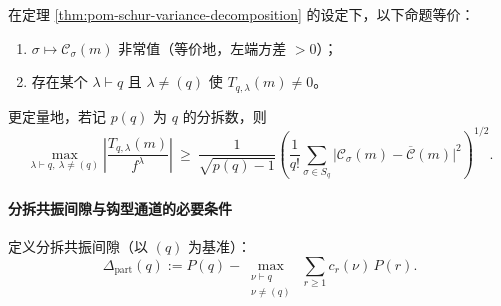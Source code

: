 \begin{corollary}\label{cor:pom-schur-nontrivial-channel-activation}
在定理 \ref{thm:pom-schur-variance-decomposition} 的设定下，以下命题等价：
\begin{enumerate}
  \item \(\sigma\mapsto \mathcal C_\sigma(m)\) 非常值（等价地，左端方差 \(>0\)）；
  \item 存在某个 \(\lambda\vdash q\) 且 \(\lambda\ne(q)\) 使 \(T_{q,\lambda}(m)\ne 0\)。
\end{enumerate}
更定量地，若记 \(p(q)\) 为 \(q\) 的分拆数，则
\[
\max_{\lambda\vdash q,\ \lambda\ne(q)}\left|\frac{T_{q,\lambda}(m)}{f^\lambda}\right|
\ \ge\
\frac{1}{\sqrt{p(q)-1}}\left(\frac{1}{q!}\sum_{\sigma\in S_q}\bigl|\mathcal{C}_\sigma(m)-\overline{\mathcal C}(m)\bigr|^2\right)^{1/2}.
\]
\end{corollary}

\paragraph{分拆共振间隙与钩型通道的必要条件}
定义分拆共振间隙（以 \((q)\) 为基准）：
\[
\Delta_{\mathrm{part}}(q)
:=
P(q)-\max_{\substack{\nu\vdash q\\ \nu\neq (q)}}\ \sum_{r\ge 1}c_r(\nu)\,P(r).
\]

